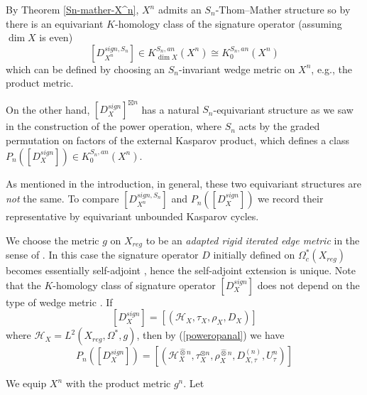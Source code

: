\documentclass[11pt,leqno,twoside]{amsart}
\theoremstyle{plainsl}
\theoremstyle{definition}
\begin{document}
By Theorem \ref{Sn-mather-X^n}, $X^n$ admits an $S_n$-Thom--Mather structure so by \cite{BLP} there is an equivariant $K$-homology class of the signature operator (assuming $\dim X$ is even) $$\left[D^{sign,S_n}_{X^n}\right]\in K_{\dim X}^{S_n,an}(X^n)\cong K_0^{S_n,an}(X^n)$$ which can be defined  by choosing an $S_n$-invariant wedge metric on $X^n$, e.g., the product metric. 


On the other hand, $\left[D^{sign}_{X}\right]^{\boxtimes n}$ has a natural $S_n$-equivariant structure as we saw in the construction of the power operation, where $S_n$ acts by the graded permutation on factors of the external Kasparov product, which defines a class  $P_n(\left[D^{sign}_{X}\right]) \in K_0^{S_n,an}(X^n)$.


As mentioned in the introduction, in general, these two equivariant structures are \textit{not} the same. To compare $\left[D^{sign,S_n}_{X^n}\right]$  and $P_n(\left[D^{sign}_{X}\right])$ we record their representative by equivariant unbounded Kasparov cycles. 

We choose the metric $g$ on $X_{reg}$ to be an \textit{adapted rigid iterated edge metric} in the sense of \cite[Prop.~5.4]{ALMP}. In this case the signature operator $D$ initially defined on $\Omega^*_{c}(X_{reg})$ becomes essentially self-adjoint \cite[Thm.~1.1]{ALMP}, hence the self-adjoint extension is unique. Note that the $K$-homology class of signature operator $\left[D_X^{sign}\right]$ does not depend on the type of wedge metric \cite{ALMP}.  If
 \[\left[D_X^{sign}\right]=[(\mathcal{H}_X,
\tau_X,\rho_{X},
D_X)]\]
where $\mathcal{H}_X
=L^2(X_{reg},\Omega^*, g)$, then by (\ref{poweropanal}) we have
\begin{equation}\label{powersignkcycle}
    P_n(\left[D^{sign}_{X}\right])=\left[(\mathcal{H}_X^{\widehat{\otimes}n},
\tau_X^{\otimes n},\rho^{\widehat{\otimes}n}_{X},
D_{X,\tau}^{(n)},U^{n}_{\tau})\right]
\end{equation}







We equip $X^n$ with the product metric $g^n$. Let
\end{document}
